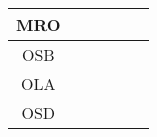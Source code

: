\documentclass[a4paper,12pt]{article}
\begin{document}
\begin{tabular}{|c|c|c|c|c|c|}
        MRO&\cellcolor[HTML]{984EA3}&\cellcolor[HTML]{4DAF4A}&\cellcolor[HTML]{4DAF4A}&\cellcolor[HTML]{984EA3}&\cellcolor[HTML]{984EA3}\\ \hline %
        OSB&\cellcolor[HTML]{984EA3}&\cellcolor[HTML]{4DAF4A}&\cellcolor[HTML]{4DAF4A}&\cellcolor[HTML]{984EA3}&\cellcolor[HTML]{984EA3}\\ \hline %
        OLA&\cellcolor[HTML]{984EA3}&\cellcolor[HTML]{4DAF4A}&\cellcolor[HTML]{984EA3}&\cellcolor[HTML]{984EA3}&\cellcolor[HTML]{984EA3}\\ \hline %
        OSD&\cellcolor[HTML]{FF7F00}&\cellcolor[HTML]{984EA3}&\cellcolor[HTML]{FF7F00}&\cellcolor[HTML]{FF7F00}&\cellcolor[HTML]{FF7F00}\\ \hline %
\end{tabular}
\end{document}
